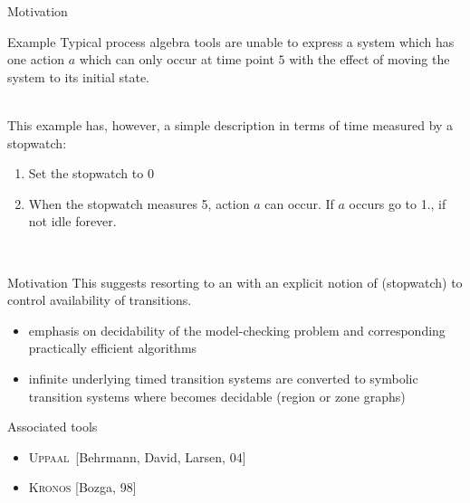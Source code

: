 \documentclass[aspectratio=169]{beamer}
\def\uppaal{\textsc{Uppaal}}
\begin{document}
\begin{slide}{Motivation}
\small

\begin{block}{Example}
Typical process algebra tools %
are unable to express a \alert{system which has one action $a$ which can only occur at time point $5$
with the effect of moving the system to its initial state.}
\end{block}
~\\

This example has, however, a simple description in terms of time measured by a \alert{stopwatch}:
\begin{enumerate}
\item Set the stopwatch to 0
\item When the stopwatch measures 5, action $a$ can occur. If $a$ occurs go to 1., if not idle forever.
\end{enumerate}

~\\
\end{slide}






\begin{slide}{Motivation}
\small
This suggests resorting to an  with an explicit notion of 
 (stopwatch) to control availability of transitions.


\begin{center}
\end{center}


\begin{itemize}
\item emphasis on decidability of the model-checking problem and corresponding practically efficient algorithms
\item infinite underlying  timed transition systems are converted to  symbolic transition systems where  becomes decidable (\alert{region} or \alert{zone} graphs)
\end{itemize}

\noindent
\alert{Associated tools}
\begin{itemize}
\item \uppaal\ [Behrmann, David, Larsen, 04]
\item \textsc{Kronos} [Bozga, 98]
\end{itemize}
\end{slide}
\end{document}

